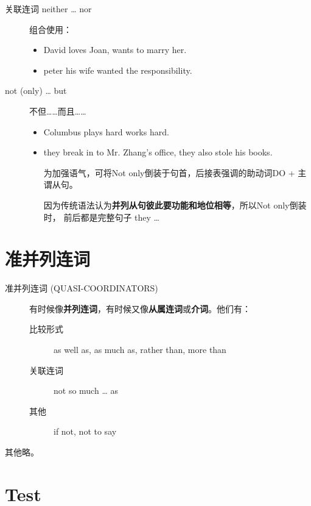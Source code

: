 \begin{description}
\item[关联连词 neither \ldots{} nor] 组合使用：
  \begin{itemize}
  \item David  loves Joan,  wants to marry her.

  \item {} peter  his wife wanted the responsibility.
  \end{itemize}


\item[not (only) \ldots{} but] 不但……而且……

  \begin{itemize}
  \item Columbus  plays hard  works hard.

  \item {} they break in to Mr. Zhang's office,  they also stole his books.

    为加强语气，可将Not only倒装于句首，后接表强调的助动词DO + 主谓从句。

    因为传统语法认为\textbf{并列从句彼此要功能和地位相等}，所以Not only倒装时，
    前后都是完整句子 they \ldots{}
  \end{itemize}
\end{description}

\section{准并列连词}
\label{subsec:quasicoor}

\begin{description}
\item[准并列连词 (QUASI-COORDINATORS)]  有时候像\textbf{并列连词}，有时候又像\textbf{从属连词}或\textbf{介词}。他们有：
  \begin{description}
  \item[比较形式] as well as, as much as, rather than, more than

  \item[关联连词] not so much \ldots{} as
  \item[其他] if not, not to say
  \end{description}
\end{description}

其他略。


\section{Test}

